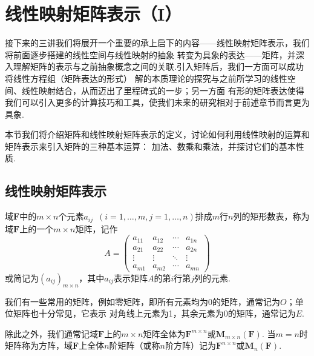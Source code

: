 \chapter{线性映射矩阵表示（I）}

接下来的三讲我们将展开一个重要的承上启下的内容——线性映射矩阵表示，我们将前面逐步搭建的线性空间与线性映射的抽象
转变为具象的表达——矩阵，并深入理解矩阵的表示与之前抽象概念之间的关联.引入矩阵后，我们一方面可以成功将线性方程组（矩阵表达的形式）
解的本质理论的探究与之前所学习的线性空间、线性映射结合，从而迈出了里程碑式的一步；另一方面
有形的矩阵表达使得我们可以引入更多的计算技巧和工具，使我们未来的研究相对于前述章节而言更为具象.

本节我们将介绍矩阵和线性映射矩阵表示的定义，讨论如何利用线性映射的运算和矩阵表示来引入矩阵的三种基本运算：
加法、数乘和乘法，并探讨它们的基本性质.

\section{线性映射矩阵表示}
\begin{definition}
    域$\mathbf{F}$中的$m\times n$个元素$a_{ij}\enspace(i=1,\ldots,m,j=1,\ldots,n)$排成$m$行$n$列的矩形数表，称为
    域$\mathbf{F}$上的一个$m\times n$矩阵，记作
    \[A=\begin{pmatrix}
        a_{11} & a_{12} & \cdots & a_{1n} \\
        a_{21} & a_{22} & \cdots & a_{2n} \\
        \vdots & \vdots & \ddots & \vdots \\
        a_{m1} & a_{m2} & \cdots & a_{mn}
    \end{pmatrix}\]
    或简记为$(a_{ij})_{m\times n}$，其中$a_{ij}$表示矩阵$A$的第$i$行第$j$列的元素.
\end{definition}

我们有一些常用的矩阵，例如零矩阵，即所有元素均为0的矩阵，通常记为$O$；单位矩阵也十分常见，它表示
对角线上元素为1，其余元素为0的矩阵，通常记为$E$.

除此之外，我们通常记域$\mathbf{F}$上的$m\times n$矩阵全体为$\mathbf{F}^{m\times n}$或$\mathbf{M}_{m\times n}(\mathbf{F})$.
当$m=n$时矩阵称为方阵，域$\mathbf{F}$上全体$n$阶矩阵（或称$n$阶方阵）记为$\mathbf{F}^{n\times n}$或$\mathbf{M}_n(\mathbf{F})$.

